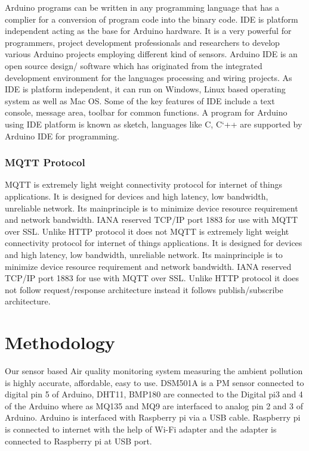 Arduino programs can be written in any programming
language that has a complier for a conversion of program code
into the binary code. IDE is platform independent acting as the
base for Arduino hardware. It is a very powerful for
programmers, project development professionals and
researchers to develop various Arduino projects employing
different kind of sensors. Arduino IDE is an open source
design/ software which has originated from the integrated
development environment for the languages processing and
wiring projects. As IDE is platform independent, it can run on
Windows, Linux based operating system as well as Mac OS. Some of the key features of IDE include a text console,
message area, toolbar for common functions. A program for
Arduino using IDE platform is known as sketch, languages
like C, C`++ are supported by Arduino IDE for programming.

\subsubsection{MQTT Protocol}

MQTT is extremely light weight connectivity protocol for
internet of things applications. It is designed for devices and
high latency, low bandwidth, unreliable network. Its
mainprinciple is to minimize device resource requirement and
network bandwidth. IANA reserved TCP/IP port 1883 for use
with MQTT over SSL. Unlike HTTP protocol it does not
MQTT is extremely light weight connectivity protocol for
internet of things applications. It is designed for devices and
high latency, low bandwidth, unreliable network. Its
mainprinciple is to minimize device resource requirement and
network bandwidth. IANA reserved TCP/IP port 1883 for use
with MQTT over SSL. Unlike HTTP protocol it does not
follow request/response architecture instead it follows
publish/subscribe architecture.

\section{Methodology}

Our sensor based Air quality monitoring system measuring
the ambient pollution is highly accurate, affordable, easy to
use. DSM501A is a PM sensor connected to digital pin 5 of
Arduino, DHT11, BMP180 are connected to the Digital pi3
and 4 of the Arduino where as MQ135 and MQ9 are
interfaced to analog pin 2 and 3 of Arduino. Arduino is
interfaced with Raspberry pi via a USB cable. Raspberry pi is
connected to internet with the help of Wi-Fi adapter and the
adapter is connected to Raspberry pi at USB port.

